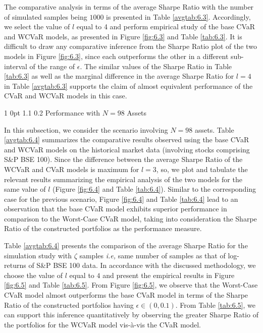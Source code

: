 \documentclass[12pt]{article}
\makeatletter
\numberwithin{equation}{section}
\renewcommand{\subsubsection}{
  \@startsection
  {subsubsection}%
  {1}%
  {0pt}%
  {1.1\baselineskip}%
  {0.2\baselineskip}%
  {\sc \centering}%
}
\makeatother
\begin{document}
The comparative analysis in terms of the average Sharpe Ratio with the number of simulated samples being $1000$ is presented in Table \ref{avgtab:6.3}. Accordingly, we select the value of $l$ equal to 4 and perform empirical study of the base CVaR and WCVaR models, as presented in Figure \ref{fig:6.3} and Table \ref{tab:6.3}. It is difficult to draw any comparative inference from the Sharpe Ratio plot of the two models in Figure \ref{fig:6.3}, since each outperforms the other in a different sub-interval of the range of $\epsilon$. The similar values of the Sharpe Ratio in Table \ref{tab:6.3} as well as the marginal difference in the average Sharpe Ratio for $l=4$ in Table \ref{avgtab:6.3} supports the claim of almost equivalent performance of the CVaR and WCVaR models in this case.

\subsubsection{Performance with $N=98$ Assets}

In this subsection, we consider the scenario involving $N=98$ assets. Table \ref{avgtab:6.4} summarizes the comparative results observed using the base 
CVaR and WCVaR models on the historical market data (involving stocks comprising S\&P BSE 100). Since the difference between the average Sharpe Ratio of the 
WCVaR and CVaR models is maximum for $l=3$, so, we plot and tabulate the relevant results summarizing the empirical analysis of the two models for the same value of $l$ (Figure \ref{fig:6.4} and Table \ref{tab:6.4}). Similar to the corresponding case for the previous scenario, Figure \ref{fig:6.4} and Table \ref{tab:6.4} lead to an observation that the base CVaR model exhibits superior performance in comparison to the Worst-Case CVaR model, taking into consideration the Sharpe Ratio of the constructed portfolios as the performance measure.

Table \ref{avgtab:6.4} presents the comparison of the average Sharpe Ratio for the simulation study with $\zeta$ samples \textit{i.e,} same number of samples as that of log-returns of S\&P BSE 100 data. In accordance with the discussed methodology, we choose the value of $l$ equal to $4$ and present the empirical results in Figure \ref{fig:6.5} and Table \ref{tab:6.5}. From Figure \ref{fig:6.5}, we observe that the Worst-Case CVaR model almost outperforms the base CVaR model in terms of the Sharpe Ratio of the constructed portfolios having $\epsilon \in (0,0.1)$. From Table \ref{tab:6.5}, we can support this inference quantitatively by observing the greater Sharpe Ratio of the portfolios for the WCVaR model vis-\`a-vis the CVaR model.
\end{document}
